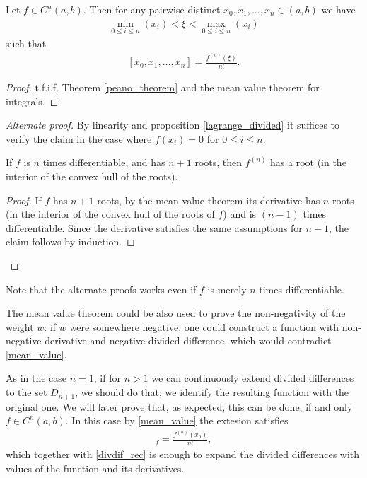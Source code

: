 \begin{lause}
	Let $f \in C^{n}(a, b)$. Then for any pairwise distinct $x_{0}, x_{1}, \ldots, x_{n} \in (a, b)$ we have
	\begin{align*}
		\min_{0 \leq i \leq n}(x_{i}) < \xi < \max_{0 \leq i \leq n}(x_{i})
	\end{align*}
	such that
	\begin{align}\label{mean_value}
		[x_{0}, x_{1}, \ldots, x_{n}] = \frac{f^{(n)}(\xi)}{n!}.
	\end{align}
\end{lause}
\begin{proof}
	t.f.i.f. Theorem \ref{peano_theorem} and the mean value theorem for integrals.
\end{proof}
\begin{proof}[Alternate proof]
	By linearity and proposition \ref{lagrange_divided} it suffices to verify the claim in the case where $f(x_{i}) = 0$ for $0 \leq i \leq n$.
	\begin{lem}
		If $f$ is $n$ times differentiable, and has $n + 1$ roots, then $f^{(n)}$ has a root (in the interior of the convex hull of the roots).
	\end{lem}
	\begin{proof}
		If $f$ has $n + 1$ roots, by the mean value theorem its derivative has $n$ roots (in the interior of the convex hull of the roots of $f$) and is $(n - 1)$ times differentiable. Since the derivative satisfies the same assumptions for $n - 1$, the claim follows by induction.
	\end{proof}
\end{proof}

Note that the alternate proofs works even if $f$ is merely $n$ times differentiable.

The mean value theorem could be also used to prove the non-negativity of the weight $w$: if $w$ were somewhere negative, one could construct a function with non-negative derivative and negative divided difference, which would contradict \ref{mean_value}.

As in the case $n = 1$, if for $n > 1$ we can continuously extend divided differences to the set $D_{n + 1}$, we should do that; we identify the resulting function with the original one. We will later prove that, as expected, this can be done, if and only $f \in C^{n}(a, b)$. In this case by \ref{mean_value} the extesion satisfies
\begin{align*}
	[x_{0}, x_{0}, \ldots, x_{0}]_{f} = \frac{f^{(n)}(x_{0})}{n!},
\end{align*}
which together with \ref{divdif_rec} is enough to expand the divided differences with values of the function and its derivatives.

